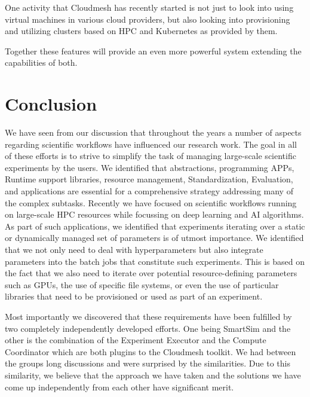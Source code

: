 \documentclass[utf8]{FrontiersinVancouver} %
\begin{document}
One activity that Cloudmesh has recently started is not just to look into using virtual machines in various cloud providers, but also looking into provisioning and utilizing clusters based on HPC and Kubernetes as provided by them. 

Together these features will provide an even more powerful system extending the capabilities of both. 




\section{Conclusion}

We have seen from our discussion that throughout the years a number of aspects regarding scientific workflows have influenced our research work. The goal in all of these efforts is to strive to simplify the task of managing large-scale scientific experiments by the users. We identified that abstractions, programming APPs, Runtime support libraries, resource management, Standardization, Evaluation, and applications are essential for a comprehensive strategy addressing many of the complex subtasks.
Recently we have focused on scientific workflows running on large-scale HPC resources while focussing on deep learning and AI algorithms. As part of such applications, we identified that experiments iterating over a static or dynamically managed set of parameters is of utmost importance. We identified that we not only need to deal with hyperparameters but also integrate parameters into the batch jobs that constitute such experiments. This is based on the fact that we also need to iterate over potential resource-defining parameters such as GPUs, the use of specific file systems, or even the use of particular libraries that need to be provisioned or used as part of an experiment.

Most importantly we discovered that these requirements have been fulfilled by two completely independently developed efforts. One being SmartSim and the other is the combination of the Experiment Executor and the Compute Coordinator which are both plugins to the Cloudmesh toolkit. We had between the groups long discussions and were surprised by the similarities. Due to this similarity, we believe that the approach we have taken and the solutions we have come up independently from each other have significant merit. 
\end{document}

